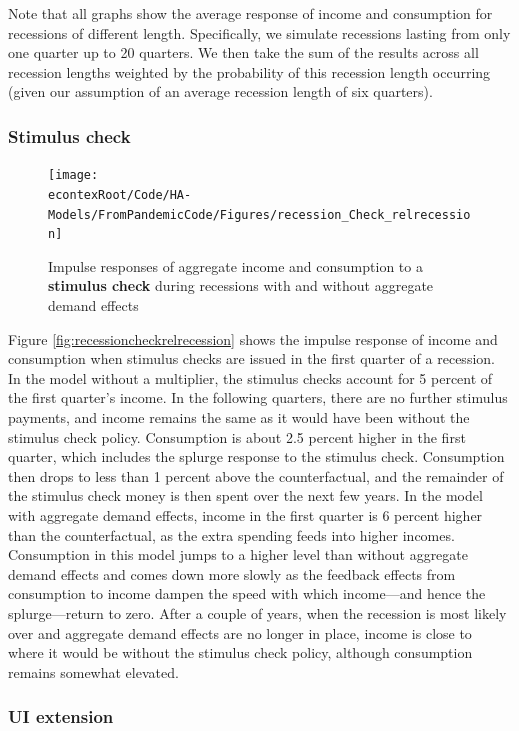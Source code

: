 \documentclass[\econtexRoot/HAFiscal]{subfiles}
\begin{document}
Note that all graphs show the average response of income and consumption for recessions of different length. Specifically, we simulate recessions lasting from only one quarter up to 20 quarters. We then take the sum of the results across all recession lengths weighted by the probability of this recession length occurring (given our assumption of an average recession length of six quarters).

\subsubsection{Stimulus check} 

\begin{figure}
  \centering
  \texttt{[image: \\econtexRoot/Code/HA-Models/FromPandemicCode/Figures/recession\_Check\_relrecession]}
  \caption{Impulse responses of aggregate income and consumption to a \textbf{stimulus check} during recessions with and without aggregate demand effects}
  \notinsubfile{\label{fig:recessioncheckrelrecession}}
\end{figure}

Figure \ref{fig:recessioncheckrelrecession} shows the impulse response of income and consumption when stimulus checks are issued in the first quarter of a recession. In the model without a multiplier, the stimulus checks account for 5 percent of the first quarter's income. In the following quarters, there are no further stimulus payments, and income remains the same as it would have been without the stimulus check policy. Consumption is about 2.5 percent higher in the first quarter, which includes the splurge response to the stimulus check. Consumption then drops to less than 1 percent above the counterfactual, and the remainder of the stimulus check money is then spent over the next few years. In the model with aggregate demand effects, income in the first quarter is 6 percent higher than the counterfactual, as the extra spending feeds into higher incomes. Consumption in this model jumps to a higher level than without aggregate demand effects and comes down more slowly as the feedback effects from consumption to income dampen the speed with which income---and hence the splurge---return to zero. After a couple of years, when the recession is most likely over and aggregate demand effects are no longer in place, income is close to where it would be without the stimulus check policy, although consumption remains somewhat elevated.

\subsubsection{UI extension}
\end{document}
